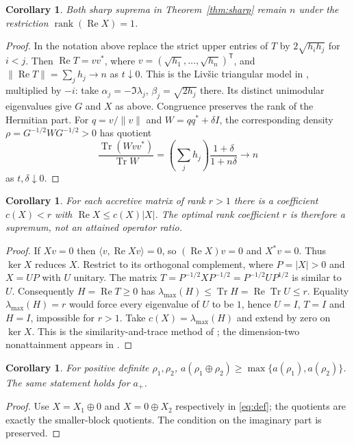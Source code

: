 \documentclass[11pt]{article}
\newcommand{\Tr}{\operatorname{Tr}}
\newcommand{\Ree}{\operatorname{Re}}
\newcommand{\rank}{\operatorname{rank}}
\newtheorem{corollary}[theorem]{Corollary}
\begin{document}
\begin{corollary}\label{cor:rankone}
Both sharp suprema in Theorem~\ref{thm:sharp} remain $n$ under the
restriction $\rank(\Ree X)=1$.
\end{corollary}
\begin{proof}
In the notation above replace the strict upper entries of $T$ by
$2\sqrt{h_ih_j}$ for $i<j$. Then $\Ree T=vv^*$, where
$v=(\sqrt{h_1},\ldots,\sqrt{h_n})^{\mathsf T}$, and
$\|\Ree T\|=\sum_jh_j\to n$ as $t\downarrow0$.
This is the Liv\v{s}ic triangular model in
\cite[Section 2.3, Theorem 2.7]{AT}, multiplied by $-i$:
take $\alpha_j=-\Im\lambda_j$, $\beta_j=\sqrt{2h_j}$ there.
Its distinct unimodular eigenvalues give $G$ and $X$ as above.
Congruence preserves the rank of the Hermitian part.
For $q=v/\|v\|$ and $W=qq^*+\delta I$, the corresponding density
$\rho=G^{-1/2}WG^{-1/2}>0$ has quotient
\[
\frac{\Tr(Wvv^*)}{\Tr W}
=\left(\sum_jh_j\right)\frac{1+\delta}{1+n\delta}\longrightarrow n
\]
as $t,\delta\downarrow0$.
\end{proof}

\begin{corollary}\label{cor:strictoperator}
For each accretive matrix of rank $r>1$ there is a coefficient
$c(X)<r$ with $\Ree X\leq c(X)|X|$. The optimal rank coefficient
$r$ is therefore a supremum, not an attained operator ratio.
\end{corollary}
\begin{proof}
If $Xv=0$ then $\langle v,\Ree Xv\rangle=0$, so
$(\Ree X)v=0$ and $X^*v=0$. Thus $\ker X$ reduces $X$.
Restrict to its orthogonal complement, where $P=|X|>0$ and
$X=UP$ with $U$ unitary. The matrix
$T=P^{-1/2}XP^{-1/2}=P^{-1/2}UP^{1/2}$ is similar to $U$.
Consequently $H=\Ree T\geq0$ has
$\lambda_{\max}(H)\leq\Tr H=\Ree\Tr U\leq r$.
Equality $\lambda_{\max}(H)=r$ would force every eigenvalue of $U$
to be $1$, hence $U=I$, $T=I$ and $H=I$, impossible for $r>1$.
Take $c(X)=\lambda_{\max}(H)$ and extend by zero on $\ker X$.
This is the similarity-and-trace method of \cite{fedja};
the dimension-two nonattainment appears in \cite{ANN}.
\end{proof}

\begin{corollary}\label{cor:blocks}
For positive definite $\rho_1,\rho_2$,
$a(\rho_1\oplus\rho_2)\geq\max\{a(\rho_1),a(\rho_2)\}$.
The same statement holds for $a_+$.
\end{corollary}
\begin{proof}
Use $X=X_1\oplus0$ and $X=0\oplus X_2$ respectively in
\eqref{eq:def}; the quotients are exactly the smaller-block quotients.
The condition on the imaginary part is preserved.
\end{proof}
\end{document}
